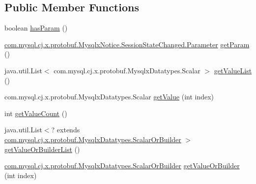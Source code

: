 \subsection*{Public Member Functions}
\begin{DoxyCompactItemize}
\item 
boolean \mbox{\hyperlink{interfacecom_1_1mysql_1_1cj_1_1x_1_1protobuf_1_1_mysqlx_notice_1_1_session_state_changed_or_builder_a4487572853d49df81e729383d0412a1b}{has\+Param}} ()
\item 
\mbox{\hyperlink{enumcom_1_1mysql_1_1cj_1_1x_1_1protobuf_1_1_mysqlx_notice_1_1_session_state_changed_1_1_parameter}{com.\+mysql.\+cj.\+x.\+protobuf.\+Mysqlx\+Notice.\+Session\+State\+Changed.\+Parameter}} \mbox{\hyperlink{interfacecom_1_1mysql_1_1cj_1_1x_1_1protobuf_1_1_mysqlx_notice_1_1_session_state_changed_or_builder_a3a5c79e7f803e50ea6d34a22b75ef129}{get\+Param}} ()
\item 
java.\+util.\+List$<$ com.\+mysql.\+cj.\+x.\+protobuf.\+Mysqlx\+Datatypes.\+Scalar $>$ \mbox{\hyperlink{interfacecom_1_1mysql_1_1cj_1_1x_1_1protobuf_1_1_mysqlx_notice_1_1_session_state_changed_or_builder_a7e59ad0b9f0435df4bc56549f3bac9c7}{get\+Value\+List}} ()
\item 
com.\+mysql.\+cj.\+x.\+protobuf.\+Mysqlx\+Datatypes.\+Scalar \mbox{\hyperlink{interfacecom_1_1mysql_1_1cj_1_1x_1_1protobuf_1_1_mysqlx_notice_1_1_session_state_changed_or_builder_a37165954f9f2d5b6c402303016ce9380}{get\+Value}} (int index)
\item 
int \mbox{\hyperlink{interfacecom_1_1mysql_1_1cj_1_1x_1_1protobuf_1_1_mysqlx_notice_1_1_session_state_changed_or_builder_a0eaf5012833e3f826328db4dcf957ae1}{get\+Value\+Count}} ()
\item 
java.\+util.\+List$<$? extends \mbox{\hyperlink{interfacecom_1_1mysql_1_1cj_1_1x_1_1protobuf_1_1_mysqlx_datatypes_1_1_scalar_or_builder}{com.\+mysql.\+cj.\+x.\+protobuf.\+Mysqlx\+Datatypes.\+Scalar\+Or\+Builder}} $>$ \mbox{\hyperlink{interfacecom_1_1mysql_1_1cj_1_1x_1_1protobuf_1_1_mysqlx_notice_1_1_session_state_changed_or_builder_aff69e1e255a120099a71f4d8f5e7355d}{get\+Value\+Or\+Builder\+List}} ()
\item 
\mbox{\hyperlink{interfacecom_1_1mysql_1_1cj_1_1x_1_1protobuf_1_1_mysqlx_datatypes_1_1_scalar_or_builder}{com.\+mysql.\+cj.\+x.\+protobuf.\+Mysqlx\+Datatypes.\+Scalar\+Or\+Builder}} \mbox{\hyperlink{interfacecom_1_1mysql_1_1cj_1_1x_1_1protobuf_1_1_mysqlx_notice_1_1_session_state_changed_or_builder_a7fc203de0737552b71fb511d1420cda3}{get\+Value\+Or\+Builder}} (int index)
\end{DoxyCompactItemize}


